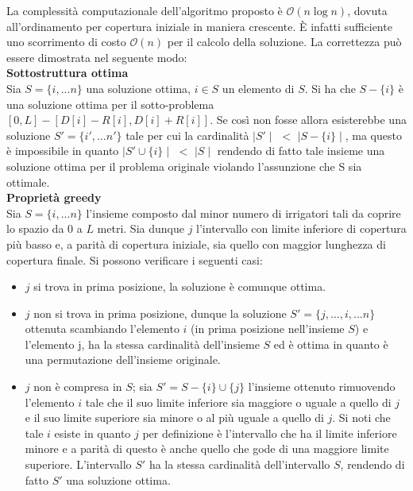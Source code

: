 \documentclass[../cheatSheetAlgoritmi.tex]{subfiles}
\begin{document}
La complessità computazionale dell'algoritmo proposto è $\mathcal{O}(n\log n)$, dovuta all'ordinamento per copertura iniziale in maniera crescente. È infatti sufficiente uno scorrimento di costo $\mathcal{O}(n)$ per il calcolo della soluzione.
La correttezza può essere dimostrata nel seguente modo: \\
\textbf{Sottostruttura ottima} \\
Sia $S = \{i, ... n\}$ una soluzione ottima, $i \in S$ un elemento di $S$. Si ha che $S - \{i\}$ è una soluzione ottima per il sotto-problema $[0, L] - [D[i] - R[i], D[i] + R[i]]$. Se così non fosse allora esisterebbe una soluzione $S' = \{i', ... n'\}$ tale per cui la cardinalità $\mid S' \mid$ $<$ $\mid S - \{i\} \mid$, ma questo è impossibile in quanto $\mid S' \cup \{i\} \mid$ $<$ $\mid S \mid$ rendendo di fatto tale insieme una soluzione ottima per il problema originale violando l'assunzione che S sia ottimale.\\
\textbf{Proprietà greedy} \\
Sia $S = \{i, ... n\}$ l'insieme composto dal minor numero di irrigatori tali da coprire lo spazio da 0 a $L$ metri. Sia dunque $j$ l'intervallo con limite inferiore di copertura più basso e, a parità di copertura iniziale, sia quello con maggior lunghezza di copertura finale. Si possono verificare i seguenti casi:
\begin{itemize}
    \item $j$ si trova in prima posizione, la soluzione è comunque ottima.
    \item $j$ non si trova in prima posizione, dunque la soluzione $S' = \{j, ..., i, ... n\}$ ottenuta scambiando l'elemento $i$ (in prima posizione nell'insieme $S$) e l'elemento j, ha la stessa cardinalità dell'insieme $S$ ed è ottima in quanto è una permutazione dell'insieme originale.
    \item $j$ non è compresa in $S$; sia $S' = S - \{i\} \cup \{j\}$ l'insieme ottenuto rimuovendo l'elemento $i$ tale che il suo limite inferiore sia maggiore o uguale a quello di $j$ e il suo limite superiore sia minore o al più uguale a quello di $j$. Si noti che tale $i$ esiste in quanto $j$ per definizione è l'intervallo che ha il limite inferiore minore e a parità di questo è anche quello che gode di una maggiore limite superiore. L'intervallo $S'$ ha la stessa cardinalità dell'intervallo $S$, rendendo di fatto $S'$ una soluzione ottima.
\end{itemize}
 
\end{document}
